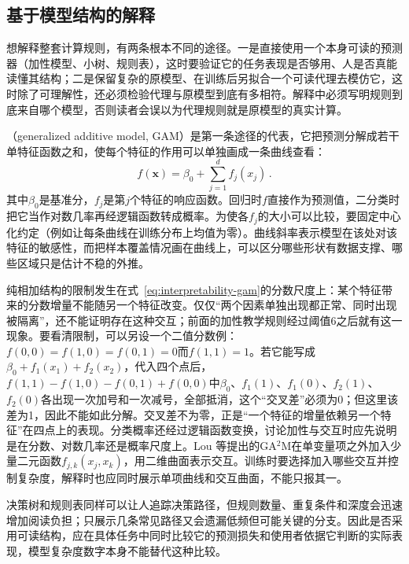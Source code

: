 \subsection{基于模型结构的解释}
\label{sec:interpretability-global-response}

想解释整套计算规则，有两条根本不同的途径。一是直接使用一个本身可读的预测器（加性模型、小树、规则表），这时要验证它的任务表现是否够用、人是否真能读懂其结构；二是保留复杂的原模型、在训练后另拟合一个可读代理去模仿它，这时除了可理解性，还必须检验代理与原模型到底有多相符。解释中必须写明规则到底来自哪个模型，否则读者会误以为代理规则就是原模型的真实计算。

（generalized additive model, GAM）是第一条途径的代表，它把预测分解成若干单特征函数之和，使每个特征的作用可以单独画成一条曲线查看：
\begin{equation}
 f(\bm{x})=\beta_0+\sum_{j=1}^{d}f_j(x_j)\, .
 \label{eq:interpretability-gam}
\end{equation}
其中$\beta_0$是基准分，$f_j$是第$j$个特征的响应函数。回归时$f$直接作为预测值，二分类时把它当作对数几率再经逻辑函数转成概率。为使各$f_j$的大小可以比较，要固定中心化约定（例如让每条曲线在训练分布上均值为零）。曲线斜率表示模型在该处对该特征的敏感性，而把样本覆盖情况画在曲线上，可以区分哪些形状有数据支撑、哪些区域只是估计不稳的外推。

纯相加结构的限制发生在式~\eqref{eq:interpretability-gam}的分数尺度上：某个特征带来的分数增量不能随另一个特征改变。仅仅“两个因素单独出现都正常、同时出现被隔离”，还不能证明存在这种交互；前面的加性教学规则经过阈值6之后就有这一现象。要看清限制，可以另设一个二值分数例：$f(0,0)=f(1,0)=f(0,1)=0$而$f(1,1)=1$。若它能写成$\beta_0+f_1(x_1)+f_2(x_2)$，代入四个点后，$f(1,1)-f(1,0)-f(0,1)+f(0,0)$中$\beta_0$、$f_1(1)$、$f_1(0)$、$f_2(1)$、$f_2(0)$各出现一次加号和一次减号，全部抵消，这个“交叉差”必须为0；但这里该差为1，因此不能如此分解。交叉差不为零，正是“一个特征的增量依赖另一个特征”在四点上的表现。分类概率还经过逻辑函数变换，讨论加性与交互时应先说明是在分数、对数几率还是概率尺度上。Lou 等提出的GA$^2$M在单变量项之外加入少量二元函数$f_{j,k}(x_j,x_k)$，用二维曲面表示交互。训练时要选择加入哪些交互并控制复杂度，解释时也应同时展示单项曲线和交互曲面，不能只报其一。

决策树和规则表同样可以让人追踪决策路径，但规则数量、重复条件和深度会迅速增加阅读负担；只展示几条常见路径又会遗漏低频但可能关键的分支。因此是否采用可读结构，应在具体任务中同时比较它的预测损失和使用者依据它判断的实际表现，模型复杂度数字本身不能替代这种比较。

